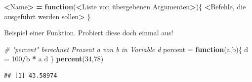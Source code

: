 \documentclass[]{book}
\newenvironment{Shaded}{\begin{snugshade}}{\end{snugshade}}
\newcommand{\KeywordTok}[1]{\textcolor[rgb]{0.13,0.29,0.53}{\textbf{#1}}}
\newcommand{\DecValTok}[1]{\textcolor[rgb]{0.00,0.00,0.81}{#1}}
\newcommand{\StringTok}[1]{\textcolor[rgb]{0.31,0.60,0.02}{#1}}
\newcommand{\CommentTok}[1]{\textcolor[rgb]{0.56,0.35,0.01}{\textit{#1}}}
\newcommand{\ControlFlowTok}[1]{\textcolor[rgb]{0.13,0.29,0.53}{\textbf{#1}}}
\newcommand{\OperatorTok}[1]{\textcolor[rgb]{0.81,0.36,0.00}{\textbf{#1}}}
\newcommand{\ErrorTok}[1]{\textcolor[rgb]{0.64,0.00,0.00}{\textbf{#1}}}
\newcommand{\NormalTok}[1]{#1}
\begin{document}
\begin{Shaded}
\begin{Highlighting}[]
\OperatorTok{<}\NormalTok{Name}\OperatorTok{>}\StringTok{ }\ErrorTok{=}\StringTok{ }\ControlFlowTok{function}\NormalTok{(}\OperatorTok{<}\NormalTok{Liste von übergebenen Argumenten}\OperatorTok{>}\NormalTok{)\{}
  \OperatorTok{<}\NormalTok{Befehle, die ausgeführt werden sollen}\OperatorTok{>}
\NormalTok{\}}
\end{Highlighting}
\end{Shaded}

Beispiel einer Funktion. Probiert diese doch einmal aus!

\begin{Shaded}
\begin{Highlighting}[]
\CommentTok{# "percent" berechnet Prozent a von b in Variable d}
\NormalTok{percent =}\StringTok{ }\ControlFlowTok{function}\NormalTok{(a,b)\{ }
\NormalTok{    d =}\StringTok{ }\DecValTok{100}\OperatorTok{/}\NormalTok{b }\OperatorTok{*}\StringTok{ }\NormalTok{a}
\NormalTok{    d}
\NormalTok{\}}
\KeywordTok{percent}\NormalTok{(}\DecValTok{34}\NormalTok{,}\DecValTok{78}\NormalTok{)}
\end{Highlighting}
\end{Shaded}

\begin{verbatim}
## [1] 43.58974
\end{verbatim}


\end{document}
